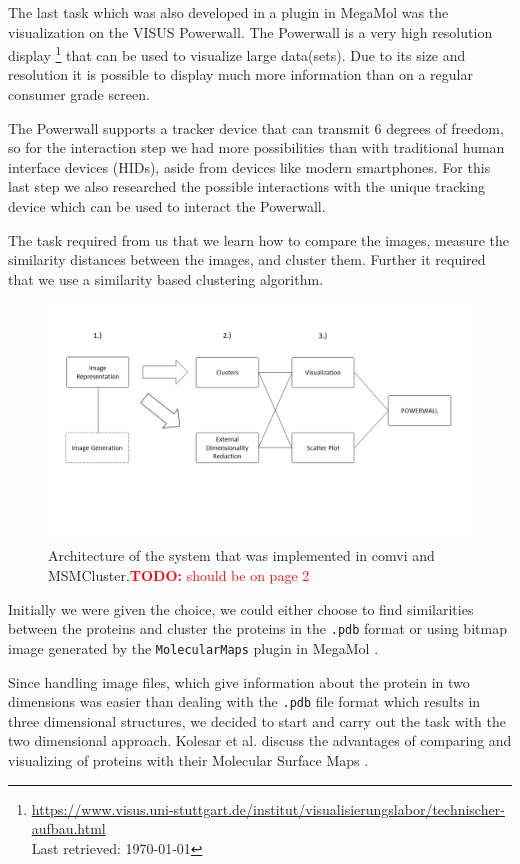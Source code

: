 \documentclass[journal]{vgtc}       %
\newcommand{\todo}[1]{\textcolor{red}{\textbf{TODO:} #1}}
\begin{document}
The last task which was also developed in a plugin in MegaMol was the visualization on the VISUS Powerwall. The Powerwall is a very high resolution display \footnote{\url{https://www.visus.uni-stuttgart.de/institut/visualisierungslabor/technischer-aufbau.html} \\ Last retrieved: \today } that can be used to visualize large data(sets). Due to its size and resolution it is possible to display much more information than on a regular consumer grade screen. 

The Powerwall supports a tracker device that can transmit 6 degrees of freedom, so for the interaction step we had more possibilities than with traditional human interface  devices  (HIDs), aside from devices like modern smartphones. For this last step we also researched the possible interactions with the unique tracking device  which can be used to interact the  Powerwall.

The task required from us that we learn how to compare the images, measure the similarity  distances between the images, and cluster them. Further it  required that we use a similarity based clustering algorithm.
\begin{figure}[htbp]
	\begin{center}
		\includegraphics[width=.75\linewidth]{Folie1}
	\end{center}
	\caption{\label{fig:arch} Architecture of the system that was implemented in comvi and MSMCluster.\todo{should be on page 2}}
\end{figure} 
Initially we were given the choice, we could either choose to find similarities between the proteins and cluster the proteins in the \verb|.pdb| format or using bitmap image generated by the \verb|MolecularMaps| plugin in MegaMol \cite{molecularmaps}.

Since handling image files, which give information about the protein in two dimensions was easier than dealing with the \verb|.pdb| file format which results in three dimensional structures, we decided to start and carry out the task with the two dimensional approach. Kolesar et al. discuss the advantages of comparing and visualizing of proteins with their Molecular Surface Maps \cite{kolesar}.
\end{document}
